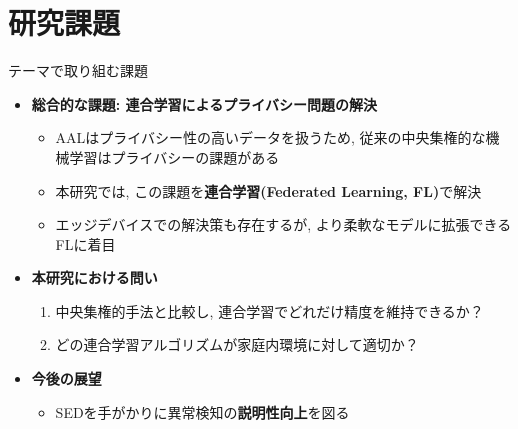 \documentclass[unicode,12pt,aspectratio=169,dvipdfmx]{beamer}
\begin{document}
\section{研究課題}
\begin{frame}{テーマで取り組む課題}
    \begin{itemize}
        \item \textbf{総合的な課題: 連合学習によるプライバシー問題の解決}
        \begin{itemize}
            \item AALはプライバシー性の高いデータを扱うため, 従来の中央集権的な機械学習はプライバシーの課題がある
            \item 本研究では, この課題を\textbf{連合学習(Federated Learning, FL)}で解決
            \item エッジデバイスでの解決策も存在するが, より柔軟なモデルに拡張できるFLに着目
        \end{itemize}
        \item \textbf{本研究における問い}
        \begin{enumerate}
            \item 中央集権的手法と比較し, 連合学習でどれだけ精度を維持できるか？
            \item どの連合学習アルゴリズムが家庭内環境に対して適切か？
        \end{enumerate}
        \item \textbf{今後の展望}
        \begin{itemize}
            \item SEDを手がかりに異常検知の\textbf{説明性向上}を図る
        \end{itemize}
    \end{itemize}
\end{frame}

\end{document}
